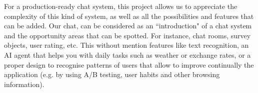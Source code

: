 For a production-ready chat system, this project allows us to appreciate the complexity of this kind of system, as well as all the possibilities and features that can be added. Our chat, can be considered as an ``introduction" of a chat system and the opportunity areas that can be spotted. For instance, chat rooms, survey objects, user rating, etc. This without mention features like text recognition, an AI agent that helps you with daily tasks such as weather or exchange rates, or a proper design to recognise patterns of users that allow to improve continually the application (e.g. by using A/B testing, user habits and other browsing information).
